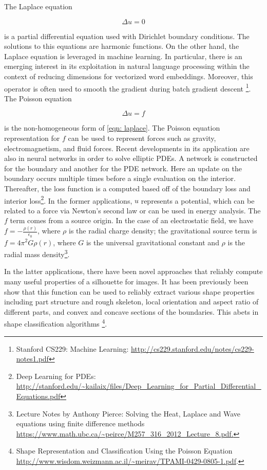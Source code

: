 \documentclass[10pt,a4paper]{article}
\begin{document}
The Laplace equation

\begin{equation}
\Delta u = 0 \label{eqn: laplace}
\end{equation}

is a partial differential equation used with Dirichlet boundary conditions. The solutions to this equations are harmonic functions. On the other hand, the Laplace equation is leveraged in machine learning. In particular, there is an emerging interest in its exploitation in natural language processing within the context of reducing dimensions for vectorized word embeddings. Moreover, this operator is often used to smooth the gradient during batch gradient descent \footnote{Stanford CS229: Machine Learning: \url{http://cs229.stanford.edu/notes/cs229-notes1.pdf} }.
The Poisson equation

\begin{equation}
\Delta u = f \label{eqn: poisson}
\end{equation}

is the non-homogeneous form of \cref{eqn: laplace}. The Poisson equation representation for $f$ can be used to represent forces such as gravity, electromagnetism, and fluid forces. Recent developments in its application are also in neural networks in order to solve elliptic PDEs. A network is constructed for the boundary and another for the PDE network. Here an update on the boundary occurs multiple times before a single evaluation on the interior. Thereafter, the loss function is a computed based off of the boundary loss and interior loss\footnote{Deep Learning for PDEs: \url{http://stanford.edu/~kailaix/files/Deep_Learning_for_Partial_Differential_Equations.pdf}}. In the former applications, $u$ represents a potential, which can be related to a force via Newton's second law or can be used in energy analysis. The $f$ term comes from a source origin. In the case of an electrostatic field, we have $f = - \frac{\rho (r)}{\epsilon_0}$, where $\rho$ is the radial charge density; the gravitational source term is $f = 4 \pi^2 G \rho(r)$, where $G$ is the universal gravitational constant and $\rho$ is the radial mass density\footnote{Lecture Notes by Anthony Pierce: Solving the Heat, Laplace and Wave equations using finite difference methods \url{https://www.math.ubc.ca/~peirce/M257_316_2012_Lecture_8.pdf.}}.


In the latter applications, there have been novel approaches that reliably compute many useful properties of a silhouette for images. It has been previously been show that this function can be used to reliably extract various shape properties including part structure and rough
skeleton, local orientation and aspect ratio of different parts, and convex and concave sections of the boundaries. This abets in shape classification algorithms \footnote{Shape Representation and Classification Using the Poisson Equation \url{http://www.wisdom.weizmann.ac.il/~meirav/TPAMI-0429-0805-1.pdf}.}.
\end{document}
